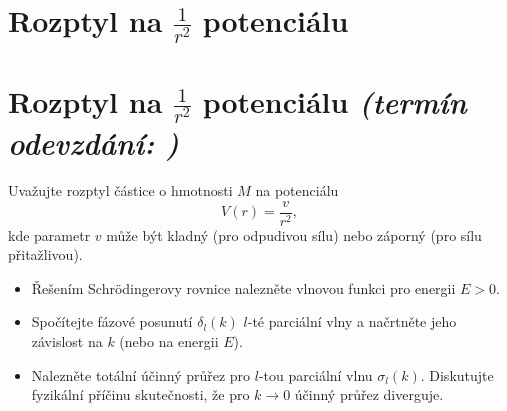 \documentclass[a4paper,11pt,twoside]{book}
\def\np{\newpage}
\newcommand{\exercise}[2][]{\ifthenelse{\isempty{#1}}
	{\np\section{#2}}
	{\np\section[#2]{{#2} \small{\it{(termín odevzdání: {#1})}}}}
}
\begin{document}
\exercise{Rozptyl na $\frac{1}{r^{2}}$ potenciálu}
    Uvažujte rozptyl částice o hmotnosti $M$ na potenciálu
    \begin{equation*}
        V(r)=\frac{v}{r^{2}},
    \end{equation*}
    kde parametr $v$ může být kladný (pro odpudivou sílu) nebo záporný (pro sílu přitažlivou).
    
    \begin{itemize}
        \item 
            Řešením Schrödingerovy rovnice nalezněte vlnovou funkci pro energii $E>0$.
            
        \item
            Spočítejte fázové posunutí $\delta_{l}(k)$ $l$-té parciální vlny 
            a načrtněte jeho závislost na $k$ (nebo na energii $E$).
            
        \item
            Nalezněte totální účinný průřez pro $l$-tou parciální vlnu $\sigma_{l}(k)$.
            Diskutujte fyzikální příčinu skutečnosti, že pro $k\rightarrow0$ účinný průřez diverguje.
    \end{itemize}    
    
\end{document}
